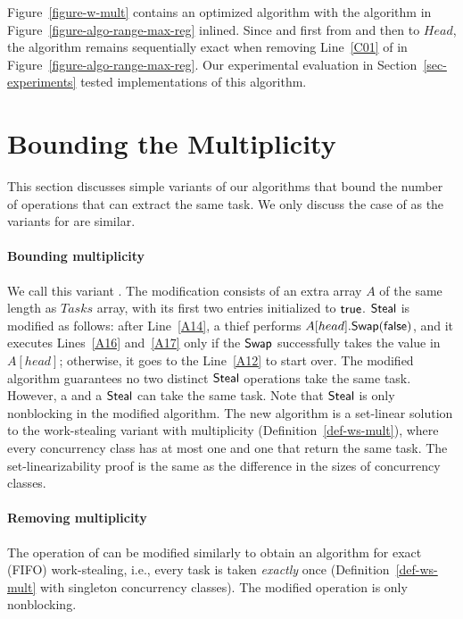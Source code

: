 Figure~\ref{figure-w-mult} contains an optimized \NCWSM algorithm with the \RangeMaxReg algorithm in Figure~\ref{figure-algo-range-max-reg} inlined. Since \Take and \Steal first \RMaxR from and then \RMaxW to \(Head\), the algorithm remains sequentially exact when removing Line~\ref{C01} of \RMaxW in Figure~\ref{figure-algo-range-max-reg}. Our experimental evaluation in Section~\ref{sec-experiments} tested implementations of this algorithm.

\section{Bounding the Multiplicity\label{sec-bound-mult}}

This section discusses simple variants of our algorithms that bound the number of operations that can extract the same task.  We only discuss the case of \WFWSM as the variants for \NCWSM are similar.

\paragraph*{Bounding multiplicity}

We call this variant \BNCWSM. The modification consists of an extra array \(A\) of the same length as \(Tasks\) array, with its first two entries initialized to ${\sf \small true}$.  ${\sf \small Steal}$ is modified as follows: after Line~\ref{A14}, a thief performs \(A[head].{\sf \small Swap}({\sf \small false})\), and it executes Lines~\ref{A16} and~\ref{A17} only if the ${\sf \small Swap}$ successfully takes the \true value in \(A[head]\); otherwise, it goes to the Line~\ref{A12} to start over.  The modified algorithm guarantees no two distinct ${\sf \small Steal}$ operations take the same task. However, a \Take and a ${\sf \small Steal}$ can take the same task.  Note that ${\sf \small Steal}$ is only nonblocking in the modified algorithm.  The new algorithm is a set-linear solution to the work-stealing variant with multiplicity (Definition~\ref{def-ws-mult}), where every concurrency class has at most one \Take and one \Steal that return the same task. The set-linearizability proof is the same as the difference in the sizes of concurrency classes.


\paragraph*{Removing multiplicity}

The \Take operation of \BNBWSM can be modified similarly to obtain an algorithm for exact (FIFO) work-stealing, i.e., every task is taken \emph{exactly} once (Definition~\ref{def-ws-mult} with singleton concurrency classes). The modified \Take operation is only nonblocking.


